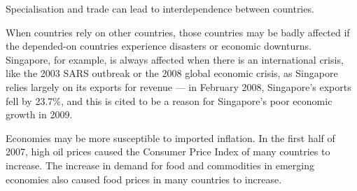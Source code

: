 \documentclass[Economics.tex]{subfiles}
\begin{document}
Specialisation and trade can lead to interdependence between countries.

When countries rely on other countries, those countries may be badly affected if the depended-on countries experience disasters or economic downturns. Singapore, for example, is always affected when there is an international crisis, like the 2003 SARS outbreak or the 2008 global economic crisis, as Singapore relies largely on its exports for revenue --- in February 2008, Singapore's exports fell by 23.7\%, and this is cited to be a reason for Singapore's poor economic growth in 2009.

Economies may be more susceptible to imported inflation. In the first half of 2007, high oil prices caused the Consumer Price Index of many countries to increase. The increase in demand for food and commodities in emerging economies also caused food prices in many countries to increase.
\end{document}
